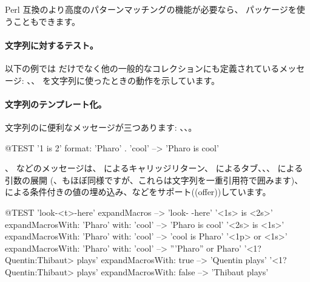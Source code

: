 \documentclass[a4paper,10pt,twoside]{book}
\begin{document}
Perl 互換のより高度のパターンマッチングの機能が必要なら、 パッケージを使うこともできます。

\paragraph{文字列に対するテスト。} 以下の例では  だけでなく他の一般的なコレクションにも定義されているメッセージ: 、、 を文字列に使ったときの動作を示しています。


\paragraph{文字列のテンプレート化。}
文字列のに便利なメッセージが三つあります: 、、。

\begin{code}{@TEST}
'{1} is {2}' format: {'Pharo' . 'cool'}  --> 'Pharo is cool'
\end{code}

、 などのメッセージは、 によるキャリッジリターン、 によるタブ、、、 による引数の展開 (、もほぼ同様ですが、これらは文字列を一重引用符で囲みます)、 による条件付きの値の埋め込み、などをサポート((offer))しています。

\begin{code}{@TEST}
'look-<t>-here' expandMacros                                         --> 'look-	-here'
'<1s> is <2s>' expandMacrosWith: 'Pharo' with: 'cool'   --> 'Pharo is cool'
'<2s> is <1s>' expandMacrosWith: 'Pharo' with: 'cool'   --> 'cool is Pharo'
'<1p> or <1s>' expandMacrosWith: 'Pharo' with: 'cool'  --> '''Pharo'' or Pharo'
'<1?Quentin:Thibaut> plays' expandMacrosWith: true     --> 'Quentin plays'
'<1?Quentin:Thibaut> plays' expandMacrosWith: false    --> 'Thibaut plays'
\end{code}
\end{document}
